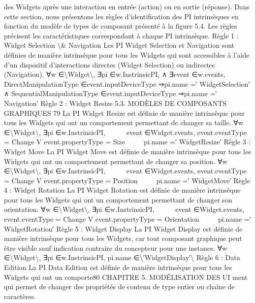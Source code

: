 \documentclass{article}
\begin{document}
des Widgets apr\`{e}s une interaction en entr\'{e}e (action) ou en sortie (r\'{e}ponse).
Dans cette section, nous pr\'{e}sentons les r\`{e}gles d’identiﬁcation des PI intrins\`{e}ques en fonction
du mod\`{e}le de types de composant pr\'{e}sent\'{e} \`{a} la ﬁgure 5.4. Les r\`{e}gles pr\'{e}cisent les caract\'{e}ristiques
correspondant \`{a} chaque PI intrins\`{e}que.
R\`{e}gle 1 : Widget Selection \textbackslash{}& Navigation
Les PI Widget Selection et Navigation sont d\'{e}ﬁnies de mani\`{e}re intrins\`{e}que pour tous les Widgets
qui sont accessibles \`{a} l’aide d’un dispositif d’interactions directes (Widget Selection) ou indirectes
(Navigation).
∀w ∈\textbackslash{}{Widget\textbackslash{}}, ∃pi ∈w.InstrinsicPI,
∧
∃event ∈w.events,
DirectManipulationType ∈event.inputDeviceType ⇒pi.name =′ WidgetSelection′
∧
SequentialManipulationType ∈event.inputDeviceType ⇒pi.name =′ Navigation′
R\`{e}gle 2 : Widget Resize
5.3. MODÈLES DE COMPOSANTS GRAPHIQUES
79
La PI Widget Resize est d\'{e}ﬁnie de mani\`{e}re intrins\`{e}que pour tous les Widgets qui ont un comportement permettant de changer sa taille.
∀w ∈\textbackslash{}{Widget\textbackslash{}}, ∃pi ∈w.InstrinsicPI,




∃event ∈Widget.events,
event.eventType = Change
V
event.propertyType = Size



⇒pi.name =′ WidgetResize′
R\`{e}gle 3 : Widget Move
La PI Widget Move est d\'{e}ﬁnie de mani\`{e}re intrins\`{e}que pour tous les Widgets qui ont un comportement permettant de changer sa position.
∀w ∈\textbackslash{}{Widget\textbackslash{}}, ∃pi ∈w.InstrinsicPI,




∃event ∈Widget.events,
event.eventType = Change
V
event.propertyType = Position



⇒pi.name =′ WidgetMove′
R\`{e}gle 4 : Widget Rotation
La PI Widget Rotation est d\'{e}ﬁnie de mani\`{e}re intrins\`{e}que pour tous les Widgets qui ont un comportement permettant de changer son orientation.
∀w ∈\textbackslash{}{Widget\textbackslash{}}, ∃pi ∈w.InstrinsicPI,




∃event ∈Widget.events,
event.eventType = Change
V
event.propertyType = Orientation



⇒pi.name =′ WidgetRotation′
R\`{e}gle 5 : Widget Display
La PI Widget Display est d\'{e}ﬁnie de mani\`{e}re intrins\`{e}que pour tous les Widgets, car tout composant
graphique peut \^{e}tre visible sauf indication contraire du concepteur pour une instance.
∀w ∈\textbackslash{}{Widget\textbackslash{}}, ∃pi ∈w.InstrinsicPI,
pi.name ∈\textbackslash{}{′WidgetDisplay′\textbackslash{}}
R\`{e}gle 6 : Data Edition
La PI Data Edition est d\'{e}ﬁnie de mani\`{e}re intrins\`{e}que pour tous les Widgets qui ont un comporte80
CHAPITRE 5. MODÉLISATION DES UI
ment qui permet de changer des propri\'{e}t\'{e}s de contenu de type entier ou cha\^{i}ne de caract\`{e}res.
\end{document}
